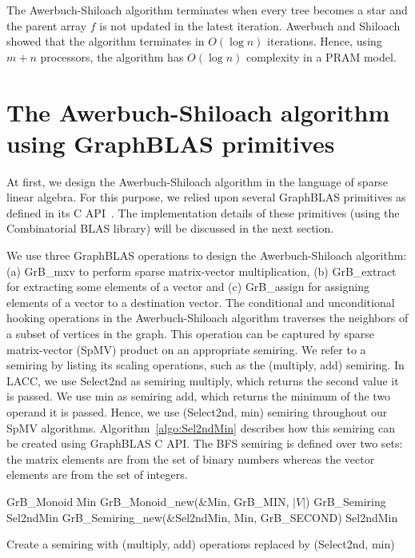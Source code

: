 The Awerbuch-Shiloach algorithm terminates when every tree becomes a star and the parent array $f$ is not updated in the latest iteration. 
Awerbuch and Shiloach showed that the algorithm terminates in $O(\log n)$ iterations. Hence, using $m+n$ processors, the algorithm has $O(\log n)$ complexity in a PRAM model. 




\section{The Awerbuch-Shiloach algorithm using GraphBLAS primitives}
\label{sec:LACC}
At first, we design the Awerbuch-Shiloach algorithm in the language of sparse linear algebra.
For this purpose, we relied upon several GraphBLAS primitives as defined in its C API~\cite{bulucc2017design}.
The implementation details of these primitives (using the Combinatorial BLAS library) will be discussed in the next section.

We use three GraphBLAS operations to design the Awerbuch-Shiloach algorithm: (a) GrB\_mxv to perform sparse matrix-vector multiplication, (b) GrB\_extract for extracting some elements of a vector and (c) GrB\_assign for assigning elements of a vector to a destination vector. 
The conditional and unconditional hooking operations in the Awerbuch-Shiloach algorithm traverses the neighbors of a subset of vertices  in the graph. This operation can be captured by sparse matrix-vector (SpMV) product on an appropriate semiring.  
We refer to a semiring by listing its scaling operations, such as the (multiply, add) semiring. 
In LACC, we use Select2nd as semiring multiply, which returns the second value it is passed. 
We use min as semiring add, which returns the minimum of the two operand it is passed.
Hence, we use (Select2nd, min) semiring throughout our SpMV algorithms. 
Algorithm~\ref{algo:Sel2ndMin} describes how this semiring can be created using GraphBLAS C API.
The BFS semiring is defined
over two sets: the matrix elements are from the set of binary
numbers whereas the vector elements are from the set of
integers.

\begin{algorithm}[htbp]
\begin{algorithmic}[1]
\begin{small}
	\State GrB\_Monoid Min
	\State GrB\_Monoid\_new(\&Min, GrB\_MIN, $\lvert V \rvert$)
	\State GrB\_Semiring Sel2ndMin
	\State GrB\_Semiring\_new(\&Sel2ndMin, Min, GrB\_SECOND)
	\State \Return Sel2ndMin
\EndProcedure
\end{small}
\end{algorithmic}
\caption{Create a semiring with (multiply, add) operations replaced by (Select2nd, min)}
\label{algo:Sel2ndMin}
\end{algorithm}



